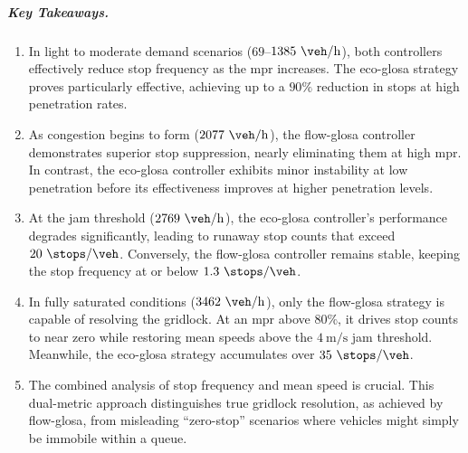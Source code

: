 \subparagraph*{Key Takeaways.}
\begin{enumerate}[label=(\alph*)]
    \item In light to moderate demand scenarios ($69$--$1385~\unit{\veh\per\hour}$), both controllers effectively reduce stop frequency as the \ac{mpr} increases. The \ac{eco-glosa} strategy proves particularly effective, achieving up to a $90\%$ reduction in stops at high penetration rates.
    
    \item As congestion begins to form ($2077~\unit{\veh\per\hour}$), the \ac{flow-glosa} controller demonstrates superior stop suppression, nearly eliminating them at high \ac{mpr}. In contrast, the \ac{eco-glosa} controller exhibits minor instability at low penetration before its effectiveness improves at higher penetration levels.
    
    \item At the jam threshold ($2769~\unit{\veh\per\hour}$), the \ac{eco-glosa} controller's performance degrades significantly, leading to runaway stop counts that exceed $20~\unit{\stops\per\veh}$. Conversely, the \ac{flow-glosa} controller remains stable, keeping the stop frequency at or below $1.3~\unit{\stops\per\veh}$.
    
    \item In fully saturated conditions ($3462~\unit{\veh\per\hour}$), only the \ac{flow-glosa} strategy is capable of resolving the gridlock. At an \ac{mpr} above $80\%$, it drives stop counts to near zero while restoring mean speeds above the $4~\unit{\metre\per\second}$ jam threshold. Meanwhile, the \ac{eco-glosa} strategy accumulates over $35~\unit{\stops\per\veh}$.
    
    \item The combined analysis of stop frequency and mean speed is crucial. This dual-metric approach distinguishes true gridlock resolution, as achieved by \ac{flow-glosa}, from misleading \enquote{zero-stop} scenarios where vehicles might simply be immobile within a queue.
\end{enumerate}

